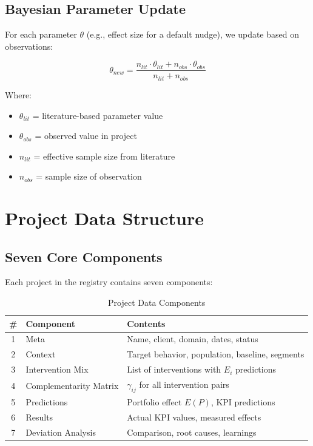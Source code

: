 \subsection{Bayesian Parameter Update}

For each parameter $\theta$ (e.g., effect size for a default nudge), we update based on observations:

\begin{equation}
\theta_{new} = \frac{n_{lit} \cdot \theta_{lit} + n_{obs} \cdot \theta_{obs}}{n_{lit} + n_{obs}}
\end{equation}

Where:
\begin{itemize}
    \item $\theta_{lit}$ = literature-based parameter value
    \item $\theta_{obs}$ = observed value in project
    \item $n_{lit}$ = effective sample size from literature
    \item $n_{obs}$ = sample size of observation
\end{itemize}

\section{Project Data Structure}

\subsection{Seven Core Components}

Each project in the registry contains seven components:

\begin{table}[h]
\centering
\begin{tabular}{clp{7cm}}
\toprule
\textbf{\#} & \textbf{Component} & \textbf{Contents} \\
\midrule
1 & Meta & Name, client, domain, dates, status \\
2 & Context & Target behavior, population, baseline, segments \\
3 & Intervention Mix & List of interventions with $E_i$ predictions \\
4 & Complementarity Matrix & $\gamma_{ij}$ for all intervention pairs \\
5 & Predictions & Portfolio effect $E(P)$, KPI predictions \\
6 & Results & Actual KPI values, measured effects \\
7 & Deviation Analysis & Comparison, root causes, learnings \\
\bottomrule
\end{tabular}
\caption{Project Data Components}
\end{table}


